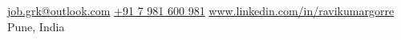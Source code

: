\documentclass[10pt,a4paper]{article}
\begin{document}
\sloppy  %



\nobreakvspace{0.3em}  %

\noindent\href{mailto:job.grk@outlook.com}{job.grk@outlook.com}\sbull
\href{tel:+917981600981}{+91 7 981 600 981}\sbull
\href{http://www.linkedin.com/in/ravikumargorre}{www.linkedin.com/in/ravikumargorre}
\\
Pune, India

\spacedhrule{0.9em}{-0.4em}  %




\end{document}
